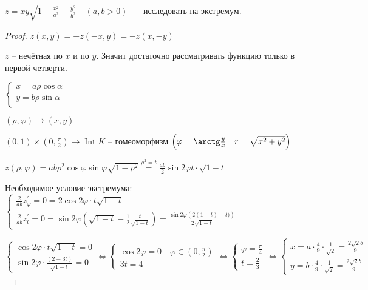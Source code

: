 \documentclass{book}
\newcommand{\p}[1]{#1^{\prime}}
\theoremstyle{definition}
\newcommand{\incfig}[1]{%
    \def\svgwidth{\columnwidth}
    {#1.pdf_tex}
}
\DeclareMathOperator{\Int}{Int}
\begin{document}
        \begin{problem}
            $z = xy\sqrt{1 - \frac{x^2}{a^2} - \frac{y^2}{b^2}}\quad (a, b>0) $~--- исследовать на экстремум.
        \end{problem}
        \begin{proof}

            $z(x, y) = -z(-x, y) = -z(x, -y)$

            $z$ -- нечётная по  $x$ и по  $y$. 
            Значит достаточно рассматривать функцию только в первой четверти.
            
            $\begin{cases}
            x = a\rho \cos \alpha\\
            y = b\rho \sin \alpha\\
            \end{cases}$

            $(\rho, \varphi) \to (x, y)$

            $(0,1) \times (0, \frac{\pi}{2}) \to \Int K$ -- гомеоморфизм $\left( \varphi = \arctg \frac{y}{x}\quad r = \sqrt{x^2+y^2}  \right) $ 
            
            $z(\rho, \varphi) = ab\rho^2\cos \varphi \sin \varphi \sqrt{1-\rho^2} \overset{\rho^2=t} = \frac {ab} 2 \sin 2\varphi t\cdot \sqrt{1-t} $

            Необходимое условие экстремума: $\begin{cases}
                \frac{2}{ab} \p z_{\varphi} = 0 = 2\cos 2\varphi\cdot t\sqrt{1-t}\\
                \frac{2}{ab}\p z_{t} = 0 = \sin 2\varphi\left( \sqrt{1-t} -\frac{1}{2} \frac{t}{\sqrt{1-t} } \right) = \frac{\sin 2\varphi \left( 2(1-t)-t) \right) }{2\sqrt{1-t} } 
            \end{cases}$ 

            $\begin{cases}
                 \cos 2\varphi \cdot  t\sqrt{1-t} = 0\\
                 \sin 2\varphi \cdot  \frac{(2-3t)}{\sqrt{1-t} } = 0
            \end{cases} \iff  \begin{cases}
            \cos 2\varphi = 0\quad \varphi \in (0, \frac{\pi}{2})\\
                3t = 4
            \end{cases} \iff  \begin{cases}
                \varphi = \frac{\pi}{4}\\
                t = \frac{2}{3}
            \end{cases} \iff  \begin{cases}
                x = a\cdot \frac{4}{9}\cdot \frac{1}{\sqrt{2} } = \frac{2\sqrt{2}b }{9}\\
                y = b \cdot  \frac{4}{9}\cdot \frac{1}{\sqrt{2} } = \frac{2\sqrt{2} b}{9}
            \end{cases}$

        \end{proof}
\end{document}
